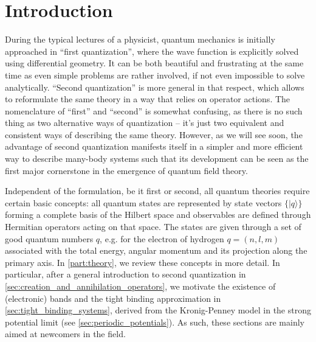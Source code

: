 %
\chapter*{Introduction}
%
During the typical lectures of a physicist, quantum mechanics is initially approached in ``first quan\-ti\-zation'', where the wave function is explicitly solved using differential geometry.
It can be both beautiful and frustrating at the same time as even simple problems are rather involved, if not even impossible to solve analytically.
``Second quantization'' is more general in that respect, which allows to reformulate the same theory in a way that relies on operator actions.
The nomenclature of ``first'' and ``second'' is somewhat confusing, as there is no such thing as two alternative ways of quantization -- it's just two equivalent and consistent ways of describing the same theory.
However, as we will see soon, the advantage of second quantization manifests itself in a simpler and more efficient way to describe many-body systems such that its development can be seen as the first major cornerstone in the emergence of quantum field theory.

Independent of the formulation, be it first or second, all quantum theories require certain basic concepts:
all quantum states are represented by state vectors $\{|q\rangle\}$ forming a complete basis of the Hilbert space and observables are defined through Hermitian operators acting on that space.
The states are given through a set of good quantum numbers $q$, e.g. for the electron of hydrogen $q=(n,l,m)$ associated with the total energy, angular momentum and its projection along the primary axis.
In \cref{part:theory}, we review these concepts in more detail.
In particular, after a general introduction to second quantization in \cref{sec:creation_and_annihilation_operators}, we motivate the existence of (electronic) bands and the tight binding approximation in \cref{sec:tight_binding_systems}, derived from the Kronig-Penney model in the strong potential limit (see \cref{sec:periodic_potentials}).
As such, these sections are mainly aimed at newcomers in the field.

